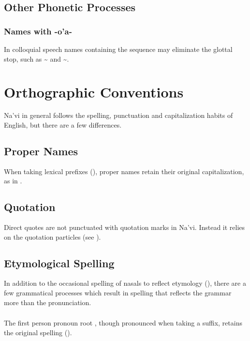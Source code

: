 \subsection{Other Phonetic Processes}

\subsubsection{Names with -o'a-} \label{names-with-oa}
In colloquial speech names containing the sequence  may
eliminate the glottal stop, such
as  \textasciitilde{}  
and  \textasciitilde {}.


\section{Orthographic Conventions}
\noindent Na'vi in general follows the spelling, punctuation and
capitalization habits of English, but there are a few differences.

\subsection{Proper Names} When taking lexical prefixes
(), proper names retain their original
capitalization, as in .

\subsection{Quotation} Direct quotes are not punctuated with quotation
marks in Na'vi.  Instead it relies on the quotation particles
 (see ).

\subsection{Etymological Spelling} In addition to the occasional
spelling of nasals to reflect etymo\-logy (),
there are a few grammatical processes which result in spelling that
reflects the grammar more than the pronunciation.

\subsubsection{} The first person pronoun root , though
pronounced  when taking a suffix, retains the original spelling
().

